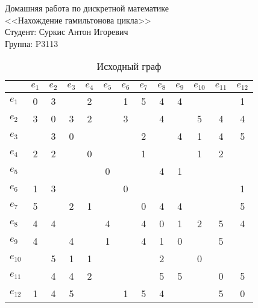 \documentclass[a4paper,12pt]{article}
\begin{document}
\pagestyle{fancy}
\fancyfoot{}

\noindent
Домашняя работа по дискретной математике \\
<<Нахождение гамильтонова цикла>> \\
Студент: Суркис Антон Игоревич \\
Группа: P3113

\begin{table}[H]
    \centering
    \caption{Исходный граф}
    \begin{tabular}{l*{3}{|cccc}}
        &$e_{1}$&$e_{2}$&$e_{3}$&$e_{4}$&$e_{5}$&$e_{6}$&$e_{7}$&$e_{8}$&$e_{9}$&$e_{10}$&$e_{11}$&$e_{12}$\\
        \hline
        $e_{1}$&0&3&&2&&1&5&4&4&&&1\\
        $e_{2}$&3&0&3&2&&3&&4&&5&4&4\\
        $e_{3}$&&3&0&&&&2&&4&1&4&5\\
        $e_{4}$&2&2&&0&&&1&&&1&2&\\
        \hline
        $e_{5}$&&&&&0&&&4&1&&&\\
        $e_{6}$&1&3&&&&0&&&&&&1\\
        $e_{7}$&5&&2&1&&&0&4&4&&&5\\
        $e_{8}$&4&4&&&4&&4&0&1&2&5&4\\
        \hline
        $e_{9}$&4&&4&&1&&4&1&0&&5&\\
        $e_{10}$&&5&1&1&&&&2&&0&&\\
        $e_{11}$&&4&4&2&&&&5&5&&0&5\\
        $e_{12}$&1&4&5&&&1&5&4&&&5&0\\
    \end{tabular}
\end{table}
\end{document}
